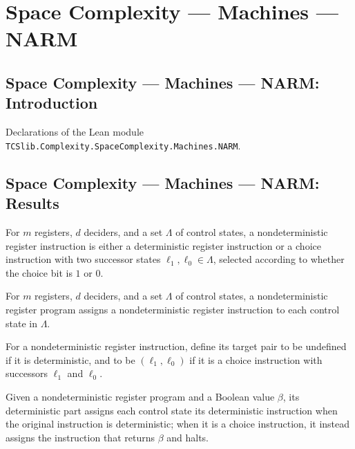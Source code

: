\section{Space Complexity --- Machines --- NARM}
\subsection*{Space Complexity --- Machines --- NARM: Introduction}

Declarations of the Lean module \texttt{TCSlib.Complexity.SpaceComplexity.Machines.NARM}.

\subsection*{Space Complexity --- Machines --- NARM: Results}

\begin{definition}
\label{Complexity.LogProg.NIns}
\leanok
{}
For $m$ registers, $d$ deciders, and a set $\Lambda$ of control states, a
nondeterministic register instruction is either a deterministic register instruction or
a choice instruction with two successor states $\ell_1,\ell_0\in\Lambda$, selected
according to whether the choice bit is $1$ or $0$.
\end{definition}

\begin{definition}
\label{Complexity.LogProg.NARM}
\leanok
{}
For $m$ registers, $d$ deciders, and a set $\Lambda$ of control states, a
nondeterministic register program assigns a nondeterministic register instruction to
each control state in $\Lambda$.
\end{definition}

\begin{definition}
\label{Complexity.LogProg.NIns.targets}
\leanok
{}
For a nondeterministic register instruction, define its target pair to be undefined if
it is deterministic, and to be $(\ell_1,\ell_0)$ if it is a choice instruction with
successors $\ell_1$ and $\ell_0$.
\end{definition}

\begin{definition}
\label{Complexity.LogProg.NARM.detPart}
\leanok
{}
Given a nondeterministic register program and a Boolean value $\beta$, its deterministic
part assigns each control state its deterministic instruction when the original
instruction is deterministic; when it is a choice instruction, it instead assigns the
instruction that returns $\beta$ and halts.
\end{definition}

